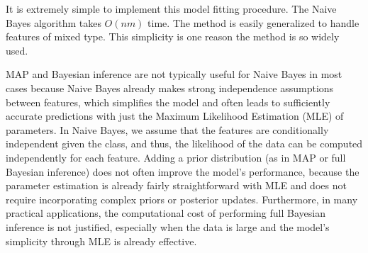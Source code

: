 \documentclass[12pt, a4paper]{article}
\theoremstyle{definition}
\numberwithin{figure}{section}
\numberwithin{equation}{section}
\numberwithin{table}{section}
\begin{document}
It is extremely simple to implement this model fitting procedure. The Naive Bayes algorithm takes $O(nm)$ time. The method is easily generalized to handle features of mixed type. This simplicity is one reason the method is so widely used.

MAP and Bayesian inference are not typically useful for Naive Bayes in most cases because Naive Bayes already makes strong independence assumptions between features, which simplifies the model and often leads to sufficiently accurate predictions with just the Maximum Likelihood Estimation (MLE) of parameters. In Naive Bayes, we assume that the features are conditionally independent given the class, and thus, the likelihood of the data can be computed independently for each feature. Adding a prior distribution (as in MAP or full Bayesian inference) does not often improve the model's performance, because the parameter estimation is already fairly straightforward with MLE and does not require incorporating complex priors or posterior updates. Furthermore, in many practical applications, the computational cost of performing full Bayesian inference is not justified, especially when the data is large and the model's simplicity through MLE is already effective.
\end{document}
